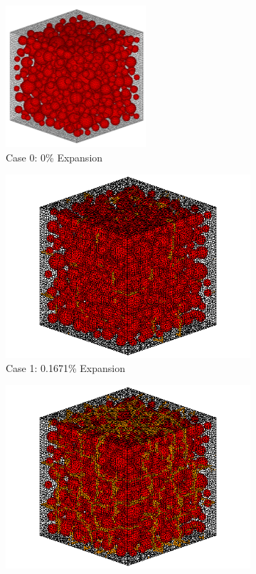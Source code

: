 \begin{figure}[!h]
\centering

    \begin{subfigure}{.5\textwidth}
      \centering
      \includegraphics[width=.6\linewidth]{Files/exp_3D/A30Undamaged.png}
    \caption{Case 0: 0\% Expansion}
    \end{subfigure}%
    \begin{subfigure}{.5\textwidth}
      \centering
      \includegraphics[width=.8\linewidth]{Files/exp_3D/DEF/A30X-5C_1_c.png}
    \caption{Case 1: 0.1671\% Expansion}
    \end{subfigure}
    \begin{subfigure}{.5\textwidth}
      \centering
      \includegraphics[width=.8\linewidth]{Files/exp_3D/DEF/A30X-5C_2_c.png}

\end{subfigure}
\end{figure}
